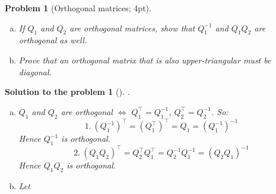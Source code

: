 \documentclass[12pt,a4]{article}
\newtheorem{problem}{Problem}
\newtheorem{solution}{Solution to the problem}
\begin{document}
\begin{problem}[Orthogonal matrices; 4pt]\rm
	\begin{enumerate}[(a)]
	\item 
	If $Q_1$ and $Q_2$ are orthogonal matrices, show that $Q_1^{-1}$ and $Q_1Q_2$ are orthogonal as well.
	\item
	Prove that an orthogonal matrix that is also upper-triangular must be diagonal.
	\end{enumerate}
\end{problem}

\begin{solution}[]\rm .
\begin{enumerate}[(a)]
\item 
$Q_1$ and $Q_2$ are orthogonal $\Leftrightarrow$ $Q_1^\top = Q_1^{-1}$, $Q_2^\top = Q_2^{-1}$. So:
\[
1.~(Q_1^{-1})^\top = (Q_1^\top)^\top  = Q_1 = (Q_1^{-1})^{-1}
\]
Hence $Q_1^{-1}$ is orthogonal.
\[
2.~(Q_1Q_2)^\top = Q_2^\top Q_1^\top = Q_2^{-1} Q_1^{-1} = (Q_2Q_1)^{-1}
\]
Hence $Q_1Q_2$ is orthogonal.
\item
Let 

\end{enumerate}
\end{solution}
\end{document}
